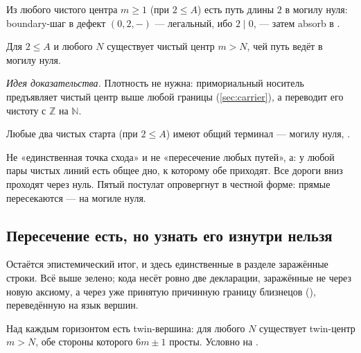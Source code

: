 \begin{theorem}\label{thm:line_to_origin}
\green{} Из любого чистого центра $m \ge 1$ (при $2 \le A$) есть путь длины $2$ в могилу нуля:
boundary-шаг в дефект $(0,2,-)$ --- легальный, ибо $2 \mid 0$, --- затем absorb в .
\end{theorem}

\begin{theorem}\label{thm:web_above_every_horizon}
\green{} Для $2 \le A$ и любого $N$ существует чистый центр $m > N$, чей путь ведёт в могилу нуля.
\end{theorem}

\emph{Идея доказательства.} Плотность не нужна: примориальный носитель
 предъявляет чистый центр выше любой границы (\cref{sec:carrier}),
а  переводит его чистоту с $\mathbb{Z}$ на $\mathbb{N}$.

\begin{theorem}\label{thm:lines_meet_at_origin}
\green{} Любые два чистых старта (при $2 \le A$) имеют общий терминал --- могилу нуля, .
\end{theorem}

Не «единственная точка схода» и не «пересечение любых путей», а: у любой пары чистых линий есть общее
дно, к которому обе приходят. Все дороги вниз проходят через нуль. Пятый постулат опровергнут в честной
форме: прямые пересекаются --- на могиле нуля.

\subsection{Пересечение есть, но узнать его изнутри нельзя}

Остаётся эпистемический итог, и здесь единственные в разделе заражённые строки. Всё выше зелено; кода
несёт ровно две декларации, заражённые не через новую аксиому, а через уже принятую причинную границу
близнецов (), переведённую на язык вершин.

\begin{theorem}\label{thm:twin_vertices_beyond_every_horizon}
\yellow{} Над каждым горизонтом есть twin-вершина: для любого $N$ существует twin-центр $m > N$, обе
стороны которого $6m \pm 1$ просты. Условно на \axiom{}.
\end{theorem}

